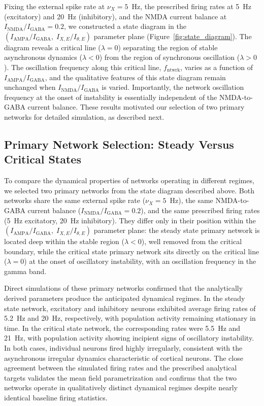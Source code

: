 \documentclass[10pt]{article}
\begin{document}
Fixing the external spike rate at $\nu_X = 5$~Hz, the prescribed firing rates at 5~Hz (excitatory) and 20~Hz (inhibitory), and the NMDA current balance at $I_{\mathrm{NMDA}}/I_{\mathrm{GABA}} = 0.2$, we constructed a state diagram in the $(I_{\mathrm{AMPA}}/I_{\mathrm{GABA}},\; I_{X,E}/I_{\theta,E})$ parameter plane (Figure~\ref{fig:state_diagram}). The diagram reveals a critical line ($\lambda = 0$) separating the region of stable asynchronous dynamics ($\lambda < 0$) from the region of synchronous oscillation ($\lambda > 0$). The oscillation frequency along this critical line, $f_{\mathrm{ntwrk}}$, varies as a function of $I_{\mathrm{AMPA}}/I_{\mathrm{GABA}}$, and the qualitative features of this state diagram remain unchanged when $I_{\mathrm{NMDA}}/I_{\mathrm{GABA}}$ is varied. Importantly, the network oscillation frequency at the onset of instability is essentially independent of the NMDA-to-GABA current balance. These results motivated our selection of two primary networks for detailed simulation, as described next.

\subsection{Primary Network Selection: Steady Versus Critical States}

To compare the dynamical properties of networks operating in different regimes, we selected two primary networks from the state diagram described above. Both networks share the same external spike rate ($\nu_X = 5$~Hz), the same NMDA-to-GABA current balance ($I_{\mathrm{NMDA}}/I_{\mathrm{GABA}} = 0.2$), and the same prescribed firing rates (5~Hz excitatory, 20~Hz inhibitory). They differ only in their position within the $(I_{\mathrm{AMPA}}/I_{\mathrm{GABA}},\; I_{X,E}/I_{\theta,E})$ parameter plane: the steady state primary network is located deep within the stable region ($\lambda < 0$), well removed from the critical boundary, while the critical state primary network sits directly on the critical line ($\lambda = 0$) at the onset of oscillatory instability, with an oscillation frequency in the gamma band.

Direct simulations of these primary networks confirmed that the analytically derived parameters produce the anticipated dynamical regimes. In the steady state network, excitatory and inhibitory neurons exhibited average firing rates of 5.2~Hz and 20~Hz, respectively, with population activity remaining stationary in time. In the critical state network, the corresponding rates were 5.5~Hz and 21~Hz, with population activity showing incipient signs of oscillatory instability. In both cases, individual neurons fired highly irregularly, consistent with the asynchronous irregular dynamics characteristic of cortical neurons. The close agreement between the simulated firing rates and the prescribed analytical targets validates the mean field parametrization and confirms that the two networks operate in qualitatively distinct dynamical regimes despite nearly identical baseline firing statistics.
\end{document}
